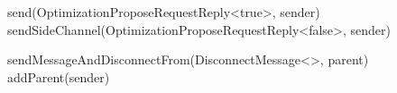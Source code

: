 \begin{algorithm}
\begin{algorithmic}[1]
             
                \State send(OptimizationProposeRequestReply<true>, sender)
            \Else
                \State sendSideChannel(OptimizationProposeRequestReply<false>, sender)
            \EndIf
        \asdend

                \State sendMessageAndDisconnectFrom(DisconnectMessage<>, parent)
                \State addParent(sender)
            \EndIf
        \asdend

    \end{algorithmic}
\end{algorithm}